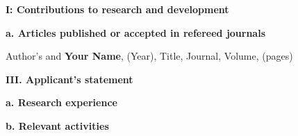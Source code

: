 \documentclass[12pt]{article} %
\begin{document}
\pagestyle{fancy}
\renewcommand{\headrulewidth}{0pt}

\textbf{I: Contributions to research and development}

\textbf{a. Articles published or accepted in refereed journals}


Author's and \textbf{Your Name}, (Year), Title, Journal, Volume, (pages)

\textbf{III. Applicant's statement}

\textbf{a.  Research experience}

\textbf{b. Relevant activities}
\end{document}
